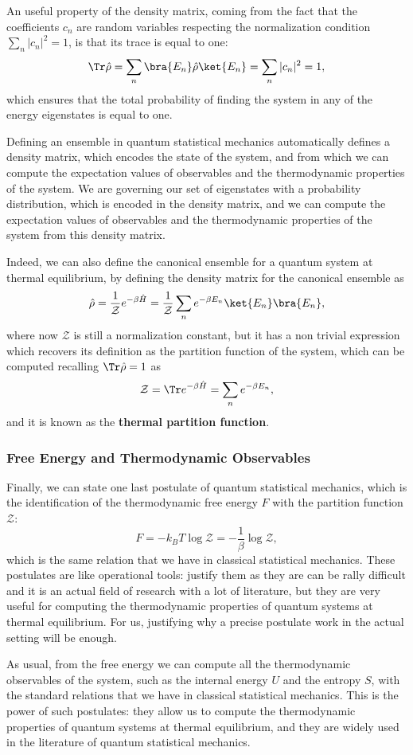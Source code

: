 \begin{remark}
    An useful property of the density matrix, coming from the fact that the coefficients \(c_n\) are random variables respecting the normalization condition \(\sum_n \vert c_n \vert^2 = 1\), is that its trace is equal to one:
    \[
        \Tr \hat{\rho} = \sum_n \bra{E_n} \hat{\rho} \ket{E_n} = \sum_n \vert c_n \vert^2 = 1,
    \]
    which ensures that the total probability of finding the system in any of the energy eigenstates is equal to one.
\end{remark}

Defining an ensemble in quantum statistical mechanics automatically defines a density matrix, which encodes the state of the system, and from which we can compute the expectation values of observables and the thermodynamic properties of the system. We are governing our set of eigenstates with a probability distribution, which is encoded in the density matrix, and we can compute the expectation values of observables and the thermodynamic properties of the system from this density matrix.

Indeed, we can also define the canonical ensemble for a quantum system at thermal equilibrium, by defining the density matrix for the canonical ensemble as
\[
    \hat{\rho} = \frac{1}{\mathcal{Z}} e^{-\beta \hat{H}} = \frac{1}{\mathcal{Z}} \sum_{n} e^{-\beta E_n} \ket{E_n} \bra{E_n},
\]
where now \(\mathcal{Z}\) is still a normalization constant, but it has a non trivial expression which recovers its definition as the partition function of the system, which can be computed recalling \(\Tr \hat{\rho} = 1\) as
\[
    \mathcal{Z} = \Tr e^{-\beta \hat{H}} = \sum_n e^{-\beta E_n},
\]
and it is known as the \textbf{thermal partition function}.

\subsubsection{Free Energy and Thermodynamic Observables}

Finally, we can state one last postulate of quantum statistical mechanics, which is the identification of the thermodynamic free energy \(F\) with the partition function \(\mathcal{Z}\):
\[
    F = -k_B T \log \mathcal{Z} = -\frac{1}{\beta} \log \mathcal{Z},
\]
which is the same relation that we have in classical statistical mechanics. These postulates are like operational tools: justify them as they are can be rally difficult and it is an actual field of research with a lot of literature, but they are very useful for computing the thermodynamic properties of quantum systems at thermal equilibrium. For us, justifying why a precise postulate work in the actual setting will be enough.

As usual, from the free energy we can compute all the thermodynamic observables of the system, such as the internal energy \(U\) and the entropy \(S\), with the standard relations that we have in classical statistical mechanics. This is the power of such postulates: they allow us to compute the thermodynamic properties of quantum systems at thermal equilibrium, and they are widely used in the literature of quantum statistical mechanics.